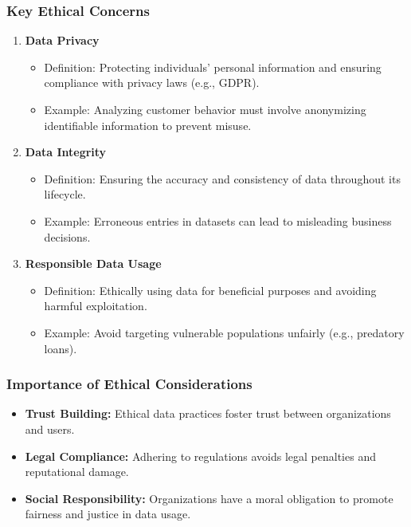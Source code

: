\documentclass[aspectratio=169]{beamer}
\begin{document}
\begin{frame}[fragile]
    \frametitle{Key Ethical Concerns}
    \begin{enumerate}
        \item \textbf{Data Privacy}
            \begin{itemize}
                \item Definition: Protecting individuals' personal information and ensuring compliance with privacy laws (e.g., GDPR).
                \item Example: Analyzing customer behavior must involve anonymizing identifiable information to prevent misuse.
            \end{itemize}
        \item \textbf{Data Integrity}
            \begin{itemize}
                \item Definition: Ensuring the accuracy and consistency of data throughout its lifecycle.
                \item Example: Erroneous entries in datasets can lead to misleading business decisions.
            \end{itemize}
        \item \textbf{Responsible Data Usage}
            \begin{itemize}
                \item Definition: Ethically using data for beneficial purposes and avoiding harmful exploitation.
                \item Example: Avoid targeting vulnerable populations unfairly (e.g., predatory loans).
            \end{itemize}
    \end{enumerate}
\end{frame}

\begin{frame}[fragile]
    \frametitle{Importance of Ethical Considerations}
    \begin{itemize}
        \item \textbf{Trust Building:} Ethical data practices foster trust between organizations and users.
        \item \textbf{Legal Compliance:} Adhering to regulations avoids legal penalties and reputational damage.
        \item \textbf{Social Responsibility:} Organizations have a moral obligation to promote fairness and justice in data usage.
    \end{itemize}
\end{frame}
\end{document}
